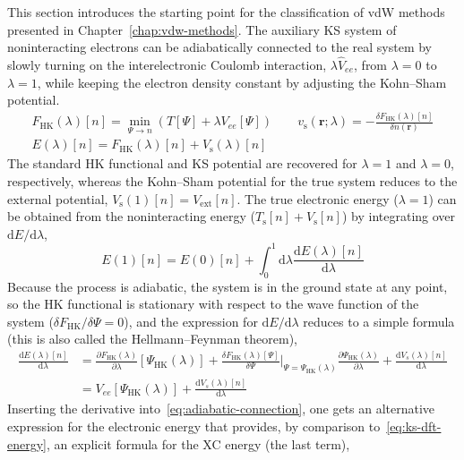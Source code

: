 This section introduces the starting point for the classification of vdW methods presented in Chapter~\ref{chap:vdw-methods}.
The auxiliary KS system of noninteracting electrons can be adiabatically connected to the real system by slowly turning on the interelectronic Coulomb interaction, $\lambda\hat V_{ee}$, from $\lambda=0$ to $\lambda=1$, while keeping the electron density constant by adjusting the Kohn--Sham potential.
\begin{equation}
\begin{gathered}
  F_\text{HK}(\lambda)[n]=\min_{\Psi\rightarrow n}(T[\Psi]+\lambda V_{ee}[\Psi])\qquad
  v_\text{s}(\mathbf r;\lambda)=-\frac{\delta F_\text{HK}(\lambda)[n]}{\delta n(\mathbf r)} \\
  E(\lambda)[n]=F_\text{HK}(\lambda)[n]+V_\text{s}(\lambda)[n]
\end{gathered}
\end{equation}
The standard HK functional and KS potential are recovered for $\lambda=1$ and $\lambda=0$, respectively, whereas the Kohn--Sham potential for the true system reduces to the external potential, $V_\text{s}(1)[n]=V_\text{ext}[n]$.
The true electronic energy ($\lambda=1$) can be obtained from the noninteracting energy ($T_\text{s}[n]+V_\text{s}[n]$) by integrating over $\mathrm dE/\mathrm d\lambda$,
\begin{equation}
  E(1)[n]=E(0)[n]+\int_0^1\mathrm d\lambda\frac{\mathrm d E(\lambda)[n]}{\mathrm d\lambda}
  \label{eq:adiabatic-connection}
\end{equation}
Because the process is adiabatic, the system is in the ground state at any point, so the HK functional is stationary with respect to the wave function of the system ($\delta F_\text{HK}/\delta\Psi=0$), and the expression for $\mathrm dE/\mathrm d\lambda$ reduces to a simple formula (this is also called the Hellmann--Feynman theorem),
\begin{equation}
\begin{aligned}
  \frac{\mathrm d E(\lambda)[n]}{\mathrm d\lambda}&=\frac{\partial F_\text{HK}(\lambda)}{\partial\lambda}[\Psi_\text{HK}(\lambda)]+\frac{\delta F_\text{HK}(\lambda)[\Psi]}{\delta\Psi}\Bigg|_{\Psi=\Psi_\text{HK}(\lambda)}\frac{\partial\Psi_\text{HK}(\lambda)}{\partial\lambda}+\frac{\mathrm dV_s(\lambda)[n]}{\mathrm d\lambda} \\
  &=V_{ee}[\Psi_\text{HK}(\lambda)]+\frac{\mathrm dV_s(\lambda)[n]}{\mathrm d\lambda}
\end{aligned}
\end{equation}
Inserting the derivative into~\eqref{eq:adiabatic-connection}, one gets an alternative expression for the electronic energy that provides, by comparison to~\eqref{eq:ks-dft-energy}, an explicit formula for the XC energy (the last term),
